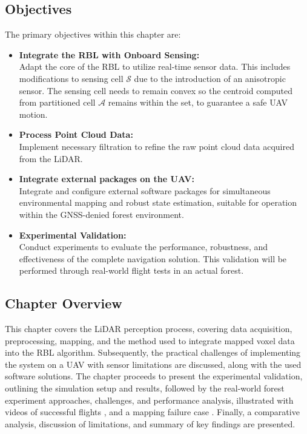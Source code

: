         \subsection{Objectives}
            The primary objectives within this chapter are: 
            \begin{itemize}
                \item \textbf{Integrate the \ac{RBL} with Onboard Sensing: } \\
                    Adapt the core of the \ac{RBL} to utilize real-time sensor data. 
                    This includes modifications to sensing cell $\mathcal{S}$ due to the introduction of an anisotropic sensor. 
                    The sensing cell needs to remain convex so the centroid computed from partitioned cell $\mathcal{A}$ remains within the set, to guarantee a safe \ac{UAV} motion.
                \item \textbf{Process Point Cloud Data: } \\
                    Implement necessary filtration to refine the raw point cloud data acquired from the \ac{LiDAR}.
                \item \textbf{Integrate external packages on the \ac{UAV}: } \\
                    Integrate and configure external software packages for simultaneous environmental mapping and robust state estimation, suitable for operation within the \ac{GNSS}-denied forest environment.
                \item \textbf{Experimental Validation: } \\
                    Conduct experiments to evaluate the performance, robustness, and effectiveness of the complete navigation solution. 
                    This validation will be performed through real-world flight tests in an actual forest.
            \end{itemize}

        \subsection{Chapter Overview}
            This chapter covers the \ac{LiDAR} perception process, covering data acquisition, preprocessing, mapping, and the method used to integrate mapped voxel data into the \ac{RBL} algorithm. 
            Subsequently, the practical challenges of implementing the system on a \ac{UAV} with sensor limitations are discussed, along with the used software solutions. 
            The chapter proceeds to present the experimental validation, outlining the simulation setup and results, followed by the real-world forest experiment approaches, challenges, and performance analysis, illustrated with videos of successful flights \cite{aggressive_flight}, \cite{conservative_flight} and a mapping failure case \cite{flight_fail}. 
            Finally, a comparative analysis, discussion of limitations, and summary of key findings are presented.
    
